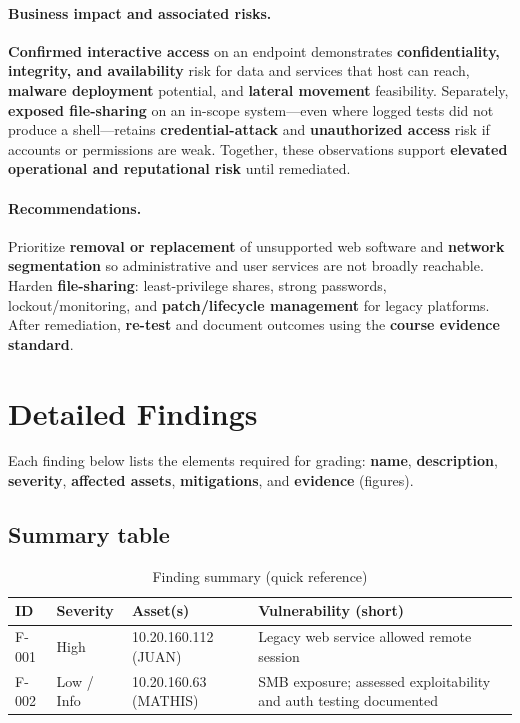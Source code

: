 \documentclass[11pt]{article}
\begin{document}
\paragraph{Business impact and associated risks.}
\textbf{Confirmed interactive access} on an endpoint demonstrates \textbf{confidentiality, integrity, and availability} risk for data and services that host can reach, \textbf{malware deployment} potential, and \textbf{lateral movement} feasibility. Separately, \textbf{exposed file-sharing} on an in-scope system---even where logged tests did not produce a shell---retains \textbf{credential-attack} and \textbf{unauthorized access} risk if accounts or permissions are weak. Together, these observations support \textbf{elevated operational and reputational risk} until remediated.

\paragraph{Recommendations.}
Prioritize \textbf{removal or replacement} of unsupported web software and \textbf{network segmentation} so administrative and user services are not broadly reachable. Harden \textbf{file-sharing}: least-privilege shares, strong passwords, lockout/monitoring, and \textbf{patch/lifecycle management} for legacy platforms. After remediation, \textbf{re-test} and document outcomes using the \textbf{course evidence standard}.

\section{Detailed Findings}
\label{sec:findings}

Each finding below lists the elements required for grading: \textbf{name}, \textbf{description}, \textbf{severity}, \textbf{affected assets}, \textbf{mitigations}, and \textbf{evidence} (figures).

\subsection*{Summary table}
\begin{table}[htbp]
\centering
\caption{Finding summary (quick reference)}
\label{tab:findings-summary}
\begin{tabular}{@{}p{2cm}p{1.8cm}p{2.4cm}p{6.8cm}@{}}
\toprule
\textbf{ID} & \textbf{Severity} & \textbf{Asset(s)} & \textbf{Vulnerability (short)} \\
\midrule
F-001 & High & 10.20.160.112 (JUAN) & Legacy web service allowed remote session \\
F-002 & Low / Info & 10.20.160.63 (MATHIS) & SMB exposure; assessed exploitability and auth testing documented \\
\bottomrule
\end{tabular}
\end{table}
\end{document}
